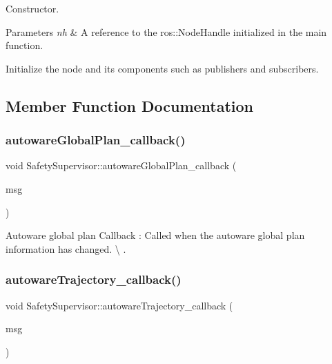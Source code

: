 Constructor. 


\begin{DoxyParams}{Parameters}
{\em nh} & A reference to the ros\+::\+Node\+Handle initialized in the main function.\\
\hline
\end{DoxyParams}
Initialize the node and its components such as publishers and subscribers. 

\subsection{Member Function Documentation}
\mbox{\label{classSafetySupervisor_a7d3db4d0d050f8dc5af1964050de50b4}} 
\subsubsection{\texorpdfstring{autoware\+Global\+Plan\+\_\+callback()}{autowareGlobalPlan\_callback()}}
{\footnotesize\ttfamily void Safety\+Supervisor\+::autoware\+Global\+Plan\+\_\+callback (\begin{DoxyParamCaption}\item[{const autoware\+\_\+msgs\+::\+Lane\+Array\+Const\+Ptr \&}]{msg }\end{DoxyParamCaption})\hspace{0.3cm}{\ttfamily [inline]}}



Autoware global plan Callback \+: Called when the autoware global plan information has changed. \textbackslash{} . 

\mbox{\label{classSafetySupervisor_a8aa112863eacb33d8d8dfcdf00407c75}} 
\subsubsection{\texorpdfstring{autoware\+Trajectory\+\_\+callback()}{autowareTrajectory\_callback()}}
{\footnotesize\ttfamily void Safety\+Supervisor\+::autoware\+Trajectory\+\_\+callback (\begin{DoxyParamCaption}\item[{const autoware\+\_\+msgs\+::\+Lane\+::\+Const\+Ptr \&}]{msg }\end{DoxyParamCaption})\hspace{0.3cm}{\ttfamily [inline]}}



